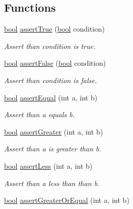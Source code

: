 \subsection*{Functions}
\begin{DoxyCompactItemize}
\item 
\hyperlink{group___utils_gaf6a258d8f3ee5206d682d799316314b1}{bool} \hyperlink{group__unit_test___assert_gaa97328e4e17a7361f0bd831d96d55990}{assert\+True} (\hyperlink{group___utils_gaf6a258d8f3ee5206d682d799316314b1}{bool} condition)
\begin{DoxyCompactList}\small\item\em Assert than condition is true. \end{DoxyCompactList}\item 
\hyperlink{group___utils_gaf6a258d8f3ee5206d682d799316314b1}{bool} \hyperlink{group__unit_test___assert_ga059f3aabaac68c7d42f74ae620c3ff24}{assert\+False} (\hyperlink{group___utils_gaf6a258d8f3ee5206d682d799316314b1}{bool} condition)
\begin{DoxyCompactList}\small\item\em Assert than condition is false. \end{DoxyCompactList}\item 
\hyperlink{group___utils_gaf6a258d8f3ee5206d682d799316314b1}{bool} \hyperlink{group__unit_test___assert_ga50264690403f285f836dc989924dde48}{assert\+Equal} (int a, int b)
\begin{DoxyCompactList}\small\item\em Assert than a equals b. \end{DoxyCompactList}\item 
\hyperlink{group___utils_gaf6a258d8f3ee5206d682d799316314b1}{bool} \hyperlink{group__unit_test___assert_gaf16ecdfac047eb381619f05c13eec429}{assert\+Greater} (int a, int b)
\begin{DoxyCompactList}\small\item\em Assert than a is greater than b. \end{DoxyCompactList}\item 
\hyperlink{group___utils_gaf6a258d8f3ee5206d682d799316314b1}{bool} \hyperlink{group__unit_test___assert_gafdb34aae8cfede5427b91c2a4783ffd7}{assert\+Less} (int a, int b)
\begin{DoxyCompactList}\small\item\em Assert than a less than than b. \end{DoxyCompactList}\item 
\hyperlink{group___utils_gaf6a258d8f3ee5206d682d799316314b1}{bool} \hyperlink{group__unit_test___assert_ga7460a41e1e22e13208e5a6a177348d97}{assert\+Greater\+Or\+Equal} (int a, int b)

\end{DoxyCompactItemize}
